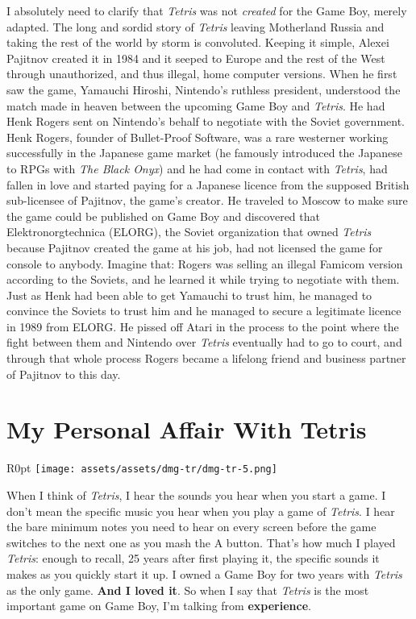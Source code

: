 \documentclass{book}
\begin{document}
I absolutely need to clarify that \emph{Tetris} was not \emph{created} for the Game Boy, merely adapted. The long and sordid story of \emph{Tetris} leaving Motherland Russia and taking the rest of the world by storm is convoluted. Keeping it simple, Alexei Pajitnov created it in 1984 and it seeped to Europe and the rest of the West through unauthorized, and thus illegal, home computer versions. When he first saw the game, Yamauchi Hiroshi, Nintendo’s ruthless president, understood the match made in heaven between the upcoming Game Boy and \emph{Tetris}. He had Henk Rogers sent on Nintendo’s behalf to negotiate with the Soviet government. Henk Rogers, founder of Bullet-Proof Software, was a rare westerner working successfully in the Japanese game market (he famously introduced the Japanese to RPGs with \emph{The Black Onyx}) and he had come in contact with \emph{Tetris}, had fallen in love and started paying for a Japanese licence from the supposed British sub-licensee of Pajitnov, the game’s creator. He traveled to Moscow to make sure the game could be published on Game Boy and discovered that Elektronorgtechnica (ELORG), the Soviet organization that owned \emph{Tetris} because Pajitnov created the game at his job, had not licensed the game for console to anybody. Imagine that: Rogers was selling an illegal Famicom version according to the Soviets, and he learned it while trying to negotiate with them. Just as Henk had been able to get Yamauchi to trust him, he managed to convince the Soviets to trust him and he managed to secure a legitimate licence in 1989 from ELORG. He pissed off Atari in the process to the point where the fight between them and Nintendo over \emph{Tetris} eventually had to go to court, and through that whole process Rogers became a lifelong friend and business partner of Pajitnov to this day.

\FloatBarrier\needspace{5pt}\section*{My Personal Affair With Tetris}\nopagebreak[4]

\begin{wrapfigure}{R}{0pt} \texttt{[image: assets/assets/dmg-tr/dmg-tr-5.png]}\end{wrapfigure}
When I think of \emph{Tetris}, I hear the sounds you hear when you start a game. I don’t mean the specific music you hear when you play a game of \emph{Tetris}. I hear the bare minimum notes you need to hear on every screen before the game switches to the next one as you mash the A button. That’s how much I played \emph{Tetris}: enough to recall, 25 years after first playing it, the specific sounds it makes as you quickly start it up. I owned a Game Boy for two years with \emph{Tetris} as the only game. \textbf{And I loved it}. So when I say that \emph{Tetris} is the most important game on Game Boy, I’m talking from \textbf{experience}.
\end{document}
